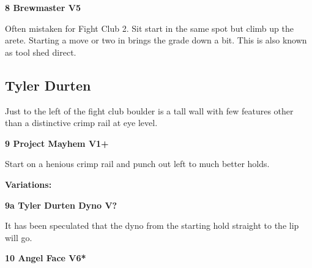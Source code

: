 \begin{multicols}{2}
			
			
			\needspace{1.5cm}
\label{rt:Brewmaster}
\colorbox{RoyalBlue!20}{
\parbox{0.95\linewidth}{
\textbf{
8 Brewmaster V5  
}}}

			\begin{adjustwidth}{0.5cm}{}			
			Often mistaken for Fight Club 2. Sit start in the same spot but climb up the arete. Starting a move or two in brings the grade down a bit. This is also known as tool shed direct.
			\end{adjustwidth}
			
			
		


		\needspace{1.5cm}
		\subsection*{Tyler Durten}\label{bf:Tyler Durten}
		Just to the left of the fight club boulder is a tall wall with few features other than a distinctive crimp rail at eye level.\\
	
		
			
			\needspace{1.5cm}
\label{rt:Project Mayhem}
\colorbox{green!20}{
\parbox{0.95\linewidth}{
\textbf{
9 Project Mayhem V1+  
}}}

			\begin{adjustwidth}{0.5cm}{}			
			Start on a henious crimp rail and punch out left to much better holds.
			\end{adjustwidth}
			
				\begin{adjustwidth}{0.5cm}{}				
				\needspace{3cm}
				\textbf{Variations:} \newline
					
					\needspace{1.5cm}
\label{vr:Tyler Durten Dyno}
\colorbox{black!20}{
\parbox{0.95\linewidth}{
\textbf{
9a Tyler Durten Dyno V?  
}}}

					\begin{adjustwidth}{0.5cm}{}			
					It has been speculated that the dyno from the starting hold straight to the lip will go.
					\end{adjustwidth}
					
					
				\end{adjustwidth}
			
			
			\needspace{1.5cm}
\label{rt:Angel Face}
\colorbox{RoyalBlue!20}{
\parbox{0.95\linewidth}{
\textbf{
10 Angel Face V6*  
}}}


\end{multicols}
